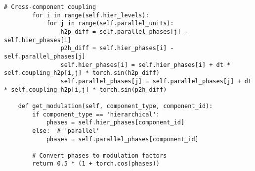 \documentclass[11pt,a4paper,twocolumn]{article}
\begin{document}
\begin{lstlisting}[caption={Oscillatory Network PyTorch Implementation}, label={lst:oscillatory-network-pytorch}]
        # Cross-component coupling
        for i in range(self.hier_levels):
            for j in range(self.parallel_units):
                h2p_diff = self.parallel_phases[j] - self.hier_phases[i]
                p2h_diff = self.hier_phases[i] - self.parallel_phases[j]
                self.hier_phases[i] = self.hier_phases[i] + dt * self.coupling_h2p[i,j] * torch.sin(h2p_diff)
                self.parallel_phases[j] = self.parallel_phases[j] + dt * self.coupling_h2p[i,j] * torch.sin(p2h_diff)

    def get_modulation(self, component_type, component_id):
        if component_type == 'hierarchical':
            phases = self.hier_phases[component_id]
        else:  # 'parallel'
            phases = self.parallel_phases[component_id]

        # Convert phases to modulation factors
        return 0.5 * (1 + torch.cos(phases))
\end{lstlisting}
\end{document}
